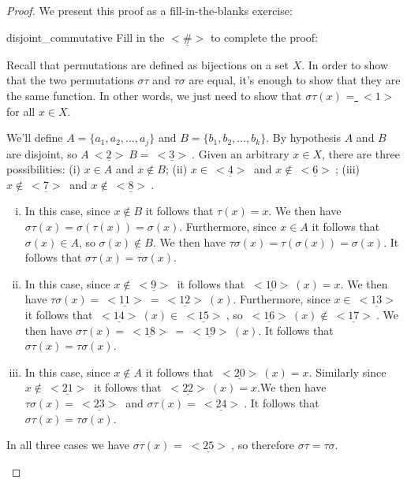 \begin{proof} We present this proof as a fill-in-the-blanks exercise:

\begin{exercise}{disjoint_commutative} Fill in the $\underline{<\#>}$  to complete the proof:

Recall that permutations are defined as bijections on a set $X$. In order to show that the two permutations 
$\sigma \tau$ and $\tau \sigma$ are equal, it's enough to show that they are the same function. In other words, we just need to show that $\sigma \tau (x)$ =\underline{ $~<1>~$} for all $x \in X$.

We'll define $A = \{a_1, a_2, \ldots, a_j\}$ and $B = \{b_1, b_2, \ldots, b_k\}$. By hypothesis $A$ and $B$ are disjoint, so $A \underline{ ~<2>~} B = \underline{ ~<3>~}$. Given an arbitrary $x \in X$, there are three possibilities: (i) $x \in A$ and $x \notin B$; (ii) $x \in \underline{ ~<4>~}$ and $x \notin \underline{ ~<6>~}$; (iii) $x \notin \underline{ ~<7>~}$ and $x \notin \underline{ ~<8>~}$. 

\begin{enumerate}[(i)]
\item
In this case, since $x \notin B$ it follows that $\tau(x) = x$. We then have $\sigma \tau (x) = \sigma(\tau(x)) = \sigma(x)$. Furthermore, since $x \in A$ it follows that $\sigma(x) \in A$, so $\sigma(x) \notin B$. We then have $\tau \sigma (x) = \tau(\sigma(x)) = \sigma(x)$. It follows that $\sigma \tau (x) = \tau \sigma (x)$.
\item
In this case, since $x \notin \underline{ ~<9>~}$ it follows that $\underline{ ~<10>~}(x) = x$. We then have $\tau \sigma (x) = \underline{ ~<11>~} = \underline{ ~<12>~}(x)$. Furthermore, since $x \in \underline{ ~<13>~}$ it follows that $\underline{ ~<14>~}(x) \in \underline{ ~<15>~}$, so $\underline{ ~<16>~}(x) \notin \underline{ ~<17>~}$. We then have $\sigma \tau (x) = \underline{ ~<18>~} = \underline{ ~<19>~}(x)$. It follows that $\sigma \tau (x) = \tau \sigma (x)$.
\item
In this case, since $x \notin A$ it follows that $\underline{ ~<20>~}(x) = x$. Similarly since $x \notin \underline{ ~<21>~}$ it follows that $\underline{ ~<22>~}(x) = x$.We then have $\tau \sigma (x) = \underline{ ~<23>~}$ and $\sigma \tau (x) = \underline{ ~<24>~}$. It follows that $\sigma \tau (x) = \tau \sigma (x)$.
\end{enumerate}

\noindent
In all three cases we have $\sigma \tau (x)$ = $\underline{ ~<25>~}$, so therefore $\sigma \tau = \tau \sigma$.
\end{exercise}
\end{proof}

